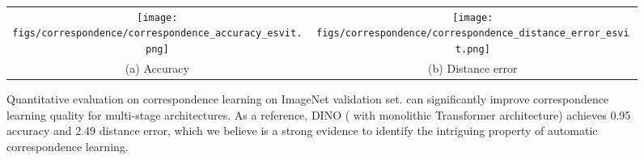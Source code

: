 \documentclass{article} \usepackage{iclr2022_conference,times}
\begin{document}
\begin{figure*}[t!]\vspace{-0mm}\centering
	\begin{tabular}{c c}
		\hspace{-2mm}
		\texttt{[image: figs/correspondence/correspondence\_accuracy\_esvit.png]} & 
		\hspace{3mm}
		\texttt{[image: figs/correspondence/correspondence\_distance\_error\_esvit.png]} 
		\\			
		(a) Accuracy
		 & 
		(b) Distance error
	\end{tabular}
	\vspace{-0mm}
	\caption{Quantitative evaluation on correspondence learning on ImageNet validation set.  can significantly improve correspondence learning quality for multi-stage architectures.  As a reference, DINO ( with monolithic Transformer architecture) achieves 0.95 accuracy and 2.49 distance error, which we believe is a strong evidence to identify the intriguing property of automatic correspondence learning.}
	\vspace{-1mm}
	\label{fig:correspondence_metrics}
\end{figure*}
\end{document}
